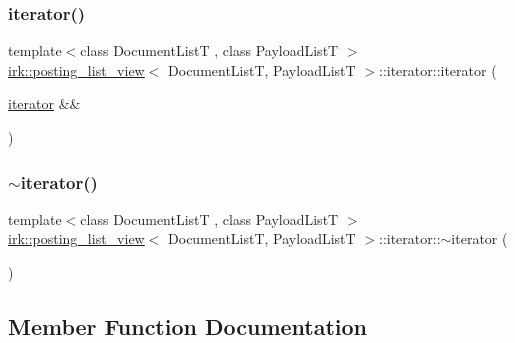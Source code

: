 \subsubsection{\texorpdfstring{iterator()}{iterator()}\hspace{0.1cm}{\footnotesize\ttfamily [3/3]}}
{\footnotesize\ttfamily template$<$class Document\+ListT , class Payload\+ListT $>$ \\
\mbox{\hyperlink{classirk_1_1posting__list__view}{irk\+::posting\+\_\+list\+\_\+view}}$<$ Document\+ListT, Payload\+ListT $>$\+::iterator\+::iterator (\begin{DoxyParamCaption}\item[{\mbox{\hyperlink{classirk_1_1posting__list__view_1_1iterator}{iterator}} \&\&}]{ }\end{DoxyParamCaption})\hspace{0.3cm}{\ttfamily [default]}}

\mbox{\label{classirk_1_1posting__list__view_1_1iterator_ace51d57fb7cb7c97433512a4f366f4cb}} 
\subsubsection{\texorpdfstring{$\sim$iterator()}{~iterator()}}
{\footnotesize\ttfamily template$<$class Document\+ListT , class Payload\+ListT $>$ \\
\mbox{\hyperlink{classirk_1_1posting__list__view}{irk\+::posting\+\_\+list\+\_\+view}}$<$ Document\+ListT, Payload\+ListT $>$\+::iterator\+::$\sim$iterator (\begin{DoxyParamCaption}{ }\end{DoxyParamCaption})\hspace{0.3cm}{\ttfamily [default]}}



\subsection{Member Function Documentation}
\mbox{\label{classirk_1_1posting__list__view_1_1iterator_a387b3e383f67002a7712c5d14daf750a}} 
